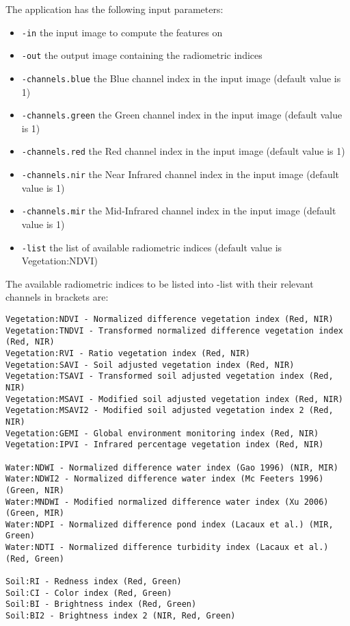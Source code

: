 The  application has the following input parameters:
\begin{itemize}
\item \verb?-in? the input image to compute the features on
\item \verb?-out? the output image containing the radiometric indices
\item \verb?-channels.blue? the Blue channel index in the input image (default value is 1)
\item \verb?-channels.green? the Green channel index in the input image (default value is 1)
\item \verb?-channels.red? the Red channel index in the input image (default value is 1)
\item \verb?-channels.nir? the Near Infrared channel index in the input image (default value is 1)
\item \verb?-channels.mir? the Mid-Infrared channel index in the input image (default value is 1)
\item \verb?-list? the list of available radiometric indices (default value is Vegetation:NDVI)
\end{itemize}

The available radiometric indices to be listed into -list with their relevant
channels in brackets are:

\begin{verbatim}
Vegetation:NDVI - Normalized difference vegetation index (Red, NIR)
Vegetation:TNDVI - Transformed normalized difference vegetation index (Red, NIR)
Vegetation:RVI - Ratio vegetation index (Red, NIR)
Vegetation:SAVI - Soil adjusted vegetation index (Red, NIR)
Vegetation:TSAVI - Transformed soil adjusted vegetation index (Red, NIR)
Vegetation:MSAVI - Modified soil adjusted vegetation index (Red, NIR)
Vegetation:MSAVI2 - Modified soil adjusted vegetation index 2 (Red, NIR)
Vegetation:GEMI - Global environment monitoring index (Red, NIR)
Vegetation:IPVI - Infrared percentage vegetation index (Red, NIR)

Water:NDWI - Normalized difference water index (Gao 1996) (NIR, MIR)
Water:NDWI2 - Normalized difference water index (Mc Feeters 1996) (Green, NIR)
Water:MNDWI - Modified normalized difference water index (Xu 2006) (Green, MIR)
Water:NDPI - Normalized difference pond index (Lacaux et al.) (MIR, Green)
Water:NDTI - Normalized difference turbidity index (Lacaux et al.) (Red, Green)

Soil:RI - Redness index (Red, Green)
Soil:CI - Color index (Red, Green)
Soil:BI - Brightness index (Red, Green)
Soil:BI2 - Brightness index 2 (NIR, Red, Green)
\end{verbatim}


